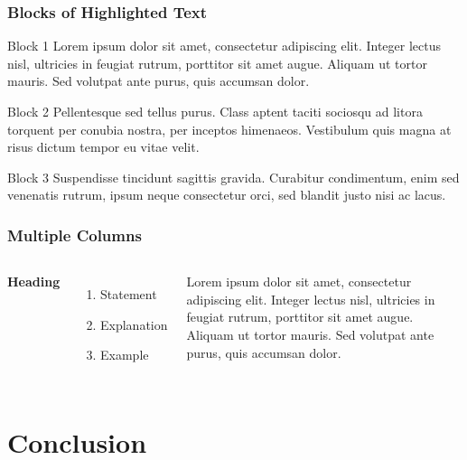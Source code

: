 \documentclass{beamer}
\begin{document}
\begin{frame}
\frametitle{Blocks of Highlighted Text}
\begin{block}{Block 1}
Lorem ipsum dolor sit amet, consectetur adipiscing elit. Integer lectus nisl, ultricies in feugiat rutrum, porttitor sit amet augue. Aliquam ut tortor mauris. Sed volutpat ante purus, quis accumsan dolor.
\end{block}

\begin{block}{Block 2}
Pellentesque sed tellus purus. Class aptent taciti sociosqu ad litora torquent per conubia nostra, per inceptos himenaeos. Vestibulum quis magna at risus dictum tempor eu vitae velit.
\end{block}

\begin{block}{Block 3}
Suspendisse tincidunt sagittis gravida. Curabitur condimentum, enim sed venenatis rutrum, ipsum neque consectetur orci, sed blandit justo nisi ac lacus.
\end{block}
\end{frame}


\begin{frame}
\frametitle{Multiple Columns}
\begin{columns}[c] %

\textbf{Heading}
\begin{enumerate}
\item Statement
\item Explanation
\item Example
\end{enumerate}

Lorem ipsum dolor sit amet, consectetur adipiscing elit. Integer lectus nisl, ultricies in feugiat rutrum, porttitor sit amet augue. Aliquam ut tortor mauris. Sed volutpat ante purus, quis accumsan dolor.

\end{columns}
\end{frame}

\section{Conclusion}
\end{document}
